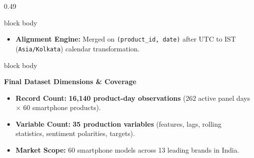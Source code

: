 \documentclass[aspectratio=169, 10pt]{beamer}
\newenvironment{card}[1][]{%
        \begin{beamercolorbox}[rounded=true,shadow=false,wd=\linewidth,sep=3.5pt,#1]{block body}%
        \fontsize{7.8pt}{9.8pt}\selectfont%
    }{%
        \end{beamercolorbox}%
    }
\begin{document}
\begin{frame}[t]
\begin{columns}[T]
\begin{column}{0.49\textwidth}
\begin{card}
\begin{itemize}
                        \item \textbf{Alignment Engine:} Merged on \texttt{(product\_id, date)} after UTC to IST (\texttt{Asia/Kolkata}) calendar transformation.                                      
                    \end{itemize}                                                                                                                                                                      
                \end{card}                                                                                                                                                                             
                \vspace{0.14cm}                                                                                                                                                                        
                \begin{card}                                                                                                                                                                           
                    \textbf{\color{BlueAccent}Final Dataset Dimensions \& Coverage}\\[0.03cm]                                                                                                          
                    \begin{itemize}\setlength{\itemsep}{1.2pt}                                                                                                                                         
                        \item \textbf{Record Count:} \textbf{16,140 product-day observations} (262 active panel days $\times$ 60 smartphone products).                                                 
                        \item \textbf{Variable Count:} \textbf{35 production variables} (features, lags, rolling statistics, sentiment polarities, targets).                                           
                        \item \textbf{Market Scope:} 60 smartphone models across 13 leading brands in India.                                                                                           
                    \end{itemize}                                                                                                                                                                      

\end{card}
\end{column}
\end{columns}
\end{frame}
\end{document}

